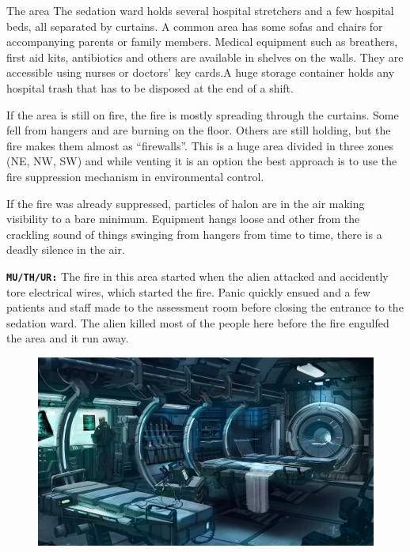 \begin{rpg-commentbox}{The area}
    The sedation ward holds several hospital stretchers and a few hospital beds, all separated by curtains. A common area has some sofas and chairs for accompanying parents or family members.
    Medical equipment such as breathers, first aid kits, antibiotics and others are available in shelves on the walls. They are accessible using nurses or doctors' key cards.A huge storage container holds any hospital trash that has to be disposed at the end of a shift. 

    If the area is still on fire, the fire is mostly spreading through the curtains. Some fell from hangers and are burning on the floor. Others are still holding, but the fire makes them almost as ``firewalls''. This is a huge area divided in three zones (NE, NW, SW) and while venting it is an option the best approach is to use the fire suppression mechanism in environmental control. 

    If the fire was already suppressed, particles of halon are in the air making visibility to a bare minimum. Equipment hangs loose and other from the crackling sound of things swinging from hangers from time to time, there is a deadly silence in the air. 

    \texttt{\textbf{MU/TH/UR:}} The fire in this area started when the alien attacked and accidently tore electrical wires, which started the fire. Panic quickly ensued and a few patients and staff made to the assessment room before closing the entrance to the sedation ward. The alien killed most of the people here before the fire engulfed the area and it run away.
\end{rpg-commentbox}  


\begin{figure}[!b]
   \centering
   \includegraphics[width=.5\textwidth]{img/bg/medical-facility.png}
   \label{fig:refinery}
\end{figure}


\newsect


